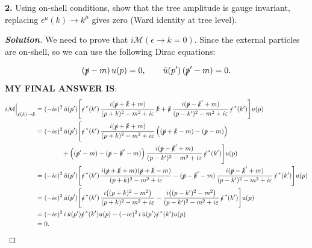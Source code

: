 \documentclass[11pt]{article}
\newenvironment{solution}[1][]{\begin{proof}[\textbf{Solution}]}{\end{proof}}
\begin{document}
\begin{tcolorbox}[problem]
\textbf{2.} Using on-shell conditions, show that the tree amplitude is gauge invariant, replacing $\epsilon^\mu(k)\to k^\mu$ gives zero (Ward identity at tree level).
\end{tcolorbox}
\begin{solution}[14.2]
	We need to prove that $i\mathcal{M}({\epsilon\to k}=0)$. Since the external particles are on-shell, so we can use the following Dirac equations:
	
	\[
	(\slashed p-m)\,u(p)=0,
	\qquad
	\bar u(p')\,(\slashed p'-m)=0.
	\]
	\textbf{MY FINAL ANSWER IS}:
	\begin{align*}
		i\mathcal M\Big|_{\slashed\epsilon(k)\to\slashed k}
		&=(-ie)^2\,\bar u(p')\Bigg[
		\slashed\epsilon^{\,*}(k')\,
		\frac{i(\slashed p+\slashed k+m)}{(p+k)^2-m^2+i\varepsilon}\,
		\slashed k
		+\slashed k\,
		\frac{i(\slashed p-\slashed k'+m)}{(p-k')^2-m^2+i\varepsilon}\,
		\slashed\epsilon^{\,*}(k')
		\Bigg]u(p)
		\\
		&=(-ie)^2\,\bar u(p')\Bigg[
		\slashed\epsilon^{\,*}(k')\,
		\frac{i(\slashed p+\slashed k+m)}{(p+k)^2-m^2+i\varepsilon}\,
		\Big((\slashed p+\slashed k-m)-(\slashed p-m)\Big)
		\\
		&\qquad\qquad
		+\Big((\slashed p'-m)-(\slashed p-\slashed k'-m)\Big)\,
		\frac{i(\slashed p-\slashed k'+m)}{(p-k')^2-m^2+i\varepsilon}\,
		\slashed\epsilon^{\,*}(k')
		\Bigg]u(p)
		\\
		&=(-ie)^2\,\bar u(p')\Bigg[
		\slashed\epsilon^{\,*}(k')\,
		\frac{i(\slashed p+\slashed k+m)(\slashed p+\slashed k-m)}{(p+k)^2-m^2+i\varepsilon}
		-(\slashed p-\slashed k'-m)\,
		\frac{i(\slashed p-\slashed k'+m)}{(p-k')^2-m^2+i\varepsilon}\,
		\slashed\epsilon^{\,*}(k')
		\Bigg]u(p)
		\\
		&=(-ie)^2\,\bar u(p')\Bigg[
		\slashed\epsilon^{\,*}(k')\,
		\frac{i\big((p+k)^2-m^2\big)}{(p+k)^2-m^2+i\varepsilon}
		-\frac{i\big((p-k')^2-m^2\big)}{(p-k')^2-m^2+i\varepsilon}\,
		\slashed\epsilon^{\,*}(k')
		\Bigg]u(p)
		\\
		&=(-ie)^2\,i\,\bar u(p')\slashed\epsilon^{\,*}(k')u(p)
		-(-ie)^2\,i\,\bar u(p')\slashed\epsilon^{\,*}(k')u(p)
		\\
		&=0.
	\end{align*}
	

\end{solution}
\end{document}
